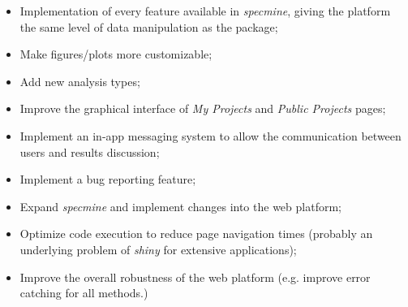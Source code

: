 \begin{itemize}
	\item Implementation of every feature available in \textit{specmine}, giving the platform the same level of data manipulation as the package;
	\item Make figures/plots more customizable;
	\item Add new analysis types;
	\item Improve the graphical interface of \textit{My Projects} and \textit{Public Projects} pages;
	\item Implement an in-app messaging system to allow the communication between users and results discussion;
	\item Implement a bug reporting feature;
	\item Expand \textit{specmine} and implement changes into the web platform;
	\item Optimize code execution to reduce page navigation times (probably an  underlying problem of \textit{shiny} for extensive applications);
	\item Improve the overall robustness of the web platform (e.g. improve error catching for all methods.)
\end{itemize}



